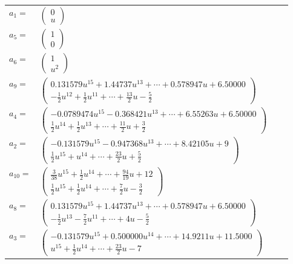 \documentclass[1p]{elsarticle_modified}
\theoremstyle{definition}
\begin{document}
\begin{tabular}{m{7pt} m{180pt} m{7pt} m{180pt} }
\flushright $a_{1}=$&$\begin{pmatrix}0\\u\end{pmatrix}$ \\
\flushright $a_{5}=$&$\begin{pmatrix}1\\0\end{pmatrix}$ \\
\flushright $a_{6}=$&$\begin{pmatrix}1\\u^2\end{pmatrix}$ \\
\flushright $a_{9}=$&$\begin{pmatrix}0.131579 u^{15}+1.44737 u^{13}+\cdots+0.578947 u+6.50000\\-\frac{1}{2} u^{12}+\frac{1}{2} u^{11}+\cdots+\frac{13}{2} u-\frac{5}{2}\end{pmatrix}$ \\
\flushright $a_{4}=$&$\begin{pmatrix}-0.0789474 u^{15}-0.368421 u^{13}+\cdots+6.55263 u+6.50000\\\frac{1}{2} u^{14}+\frac{1}{2} u^{13}+\cdots+\frac{11}{2} u+\frac{3}{2}\end{pmatrix}$ \\
\flushright $a_{2}=$&$\begin{pmatrix}-0.131579 u^{15}-0.947368 u^{13}+\cdots+8.42105 u+9\\\frac{1}{2} u^{15}+u^{14}+\cdots+\frac{23}{2} u+\frac{5}{2}\end{pmatrix}$ \\
\flushright $a_{10}=$&$\begin{pmatrix}\frac{3}{38} u^{15}+\frac{1}{2} u^{14}+\cdots+\frac{94}{19} u+12\\\frac{1}{2} u^{15}+\frac{1}{2} u^{14}+\cdots+\frac{7}{2} u-\frac{3}{2}\end{pmatrix}$ \\
\flushright $a_{8}=$&$\begin{pmatrix}0.131579 u^{15}+1.44737 u^{13}+\cdots+0.578947 u+6.50000\\-\frac{1}{2} u^{13}-\frac{7}{2} u^{11}+\cdots+4 u-\frac{5}{2}\end{pmatrix}$ \\
\flushright $a_{3}=$&$\begin{pmatrix}-0.131579 u^{15}+0.500000 u^{14}+\cdots+14.9211 u+11.5000\\u^{15}+\frac{1}{2} u^{14}+\cdots+\frac{23}{2} u-7\end{pmatrix}$ \\

\end{tabular}
\end{document}
